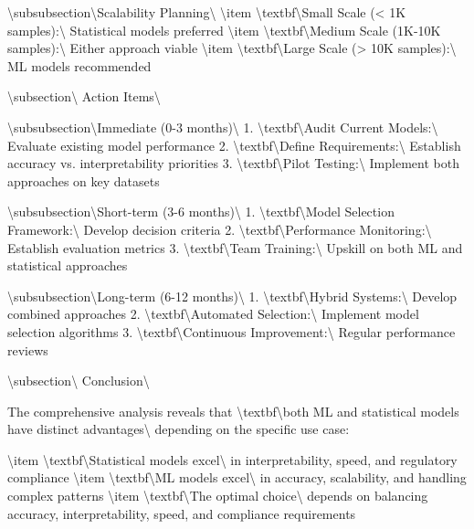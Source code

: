 \documentclass[11pt,a4paper]{article}
\begin{document}
\textbackslash{}subsubsection\textbackslash{}{Scalability Planning\textbackslash{}}
\textbackslash{}item \textbackslash{}textbf\textbackslash{}{Small Scale (< 1K samples):\textbackslash{}} Statistical models preferred
\textbackslash{}item \textbackslash{}textbf\textbackslash{}{Medium Scale (1K-10K samples):\textbackslash{}} Either approach viable
\textbackslash{}item \textbackslash{}textbf\textbackslash{}{Large Scale (> 10K samples):\textbackslash{}} ML models recommended

\textbackslash{}subsection\textbackslash{}{ Action Items\textbackslash{}}

\textbackslash{}subsubsection\textbackslash{}{Immediate (0-3 months)\textbackslash{}}
1. \textbackslash{}textbf\textbackslash{}{Audit Current Models:\textbackslash{}} Evaluate existing model performance
2. \textbackslash{}textbf\textbackslash{}{Define Requirements:\textbackslash{}} Establish accuracy vs. interpretability priorities
3. \textbackslash{}textbf\textbackslash{}{Pilot Testing:\textbackslash{}} Implement both approaches on key datasets

\textbackslash{}subsubsection\textbackslash{}{Short-term (3-6 months)\textbackslash{}}
1. \textbackslash{}textbf\textbackslash{}{Model Selection Framework:\textbackslash{}} Develop decision criteria
2. \textbackslash{}textbf\textbackslash{}{Performance Monitoring:\textbackslash{}} Establish evaluation metrics
3. \textbackslash{}textbf\textbackslash{}{Team Training:\textbackslash{}} Upskill on both ML and statistical approaches

\textbackslash{}subsubsection\textbackslash{}{Long-term (6-12 months)\textbackslash{}}
1. \textbackslash{}textbf\textbackslash{}{Hybrid Systems:\textbackslash{}} Develop combined approaches
2. \textbackslash{}textbf\textbackslash{}{Automated Selection:\textbackslash{}} Implement model selection algorithms
3. \textbackslash{}textbf\textbackslash{}{Continuous Improvement:\textbackslash{}} Regular performance reviews

\textbackslash{}subsection\textbackslash{}{ Conclusion\textbackslash{}}

The comprehensive analysis reveals that \textbackslash{}textbf\textbackslash{}{both ML and statistical models have distinct advantages\textbackslash{}} depending on the specific use case:

\textbackslash{}item \textbackslash{}textbf\textbackslash{}{Statistical models excel\textbackslash{}} in interpretability, speed, and regulatory compliance
\textbackslash{}item \textbackslash{}textbf\textbackslash{}{ML models excel\textbackslash{}} in accuracy, scalability, and handling complex patterns
\textbackslash{}item \textbackslash{}textbf\textbackslash{}{The optimal choice\textbackslash{}} depends on balancing accuracy, interpretability, speed, and compliance requirements
\end{document}
